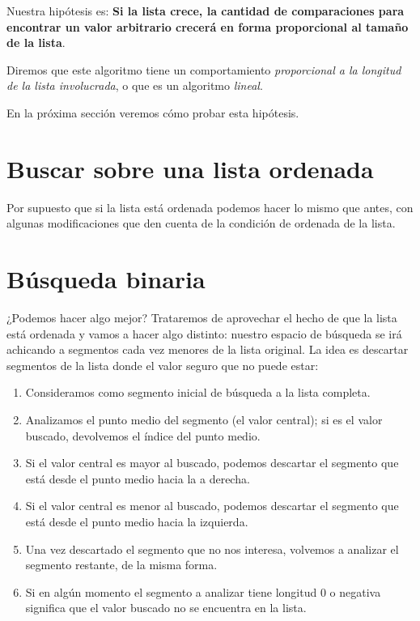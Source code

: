 Nuestra hipótesis es: {\bf Si la lista crece, la cantidad de comparaciones
para encontrar un valor arbitrario crecerá en forma proporcional al tamaño de
la lista}.

Diremos que este algoritmo tiene un comportamiento \emph{proporcional a la
longitud de la lista involucrada}, o que es un algoritmo \emph{lineal}.

En la próxima sección veremos cómo probar esta hipótesis.

\section{Buscar sobre una lista ordenada}

Por supuesto que si la lista está ordenada podemos hacer lo mismo que antes,
con algunas modificaciones que den cuenta de la condición de ordenada de la
lista.


\section{Búsqueda binaria}

¿Podemos hacer algo mejor? Trataremos de aprovechar el hecho de que la lista
está ordenada y vamos a hacer algo distinto: nuestro espacio de búsqueda se
irá achicando a segmentos cada vez menores de la lista original.
La idea es descartar segmentos de la lista donde el valor seguro que no puede
estar:

\begin{enumerate}
\item Consideramos como segmento inicial de búsqueda a la lista completa.

\item Analizamos el punto medio del segmento (el valor central); si es el valor
buscado, devolvemos el índice del punto medio.

\item Si el valor central es mayor al buscado, podemos descartar el segmento
que está desde el punto medio hacia la a derecha.

\item Si el valor central es menor al buscado, podemos descartar el segmento
que está desde el punto medio hacia la izquierda.

\item Una vez descartado el segmento que no nos interesa, volvemos a analizar
el segmento restante, de la misma forma.

\item Si en algún momento el segmento a analizar tiene longitud 0 o negativa
significa que el valor buscado no se encuentra en la lista.
\end{enumerate}

